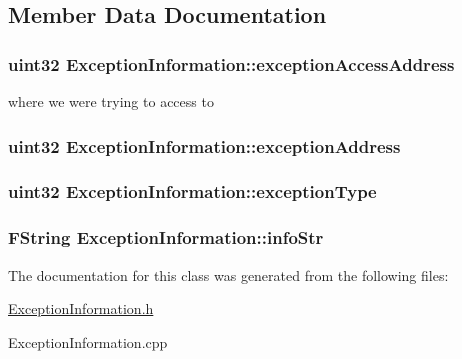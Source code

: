 \subsection{Member Data Documentation}
\hypertarget{classExceptionInformation_a38fb450b3af0d70d1d06776ae9835c84}{
\subsubsection[{exceptionAccessAddress}]{\setlength{\rightskip}{0pt plus 5cm}uint32 {\bf ExceptionInformation::exceptionAccessAddress}}}
\label{classExceptionInformation_a38fb450b3af0d70d1d06776ae9835c84}
where we were trying to access to \hypertarget{classExceptionInformation_ae0608cd7a56716e60946c10c36ae132a}{
\subsubsection[{exceptionAddress}]{\setlength{\rightskip}{0pt plus 5cm}uint32 {\bf ExceptionInformation::exceptionAddress}}}
\label{classExceptionInformation_ae0608cd7a56716e60946c10c36ae132a}
\hypertarget{classExceptionInformation_a00c1f0031b92c644f1713c1b4e8bb195}{
\subsubsection[{exceptionType}]{\setlength{\rightskip}{0pt plus 5cm}uint32 {\bf ExceptionInformation::exceptionType}}}
\label{classExceptionInformation_a00c1f0031b92c644f1713c1b4e8bb195}
\hypertarget{classExceptionInformation_af1203c0eca73957dbeb5c484eacd10df}{
\subsubsection[{infoStr}]{\setlength{\rightskip}{0pt plus 5cm}FString {\bf ExceptionInformation::infoStr}}}
\label{classExceptionInformation_af1203c0eca73957dbeb5c484eacd10df}


The documentation for this class was generated from the following files:\begin{DoxyCompactItemize}
\item 
\hyperlink{ExceptionInformation_8h}{ExceptionInformation.h}\item 
ExceptionInformation.cpp\end{DoxyCompactItemize}
